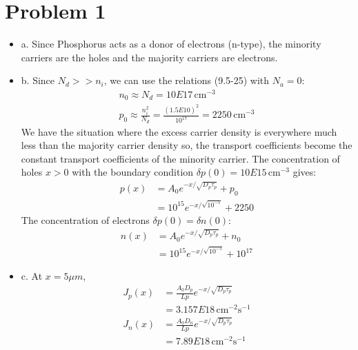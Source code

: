 \documentclass{article}
\newcommand{\unit}[1]{\ensuremath{\, \mathrm{#1}}}
\numberwithin{equation}{section}
\begin{document}
\section*{Problem 1}
\begin{itemize}
\item a. Since Phosphorus acts as a donor of electrons (n-type), the minority carriers are the holes and the majority carriers are electrons.
\item b. Since $N_d>>n_i$, we can use the relations (9.5-25) with $N_a=0$:
\begin{align*}
n_0\approx N_d=10E17 \unit{cm^{-3}}\\
p_0\approx \frac{n_i^2}{N_d}=\frac{(1.5E10)^2}{10^{17}}=2250 \unit{cm^{-3}}
\end{align*}
We have the situation where the excess carrier density is everywhere much less than the majority carrier density so, the transport coefficients become the constant transport coefficients of the minority carrier. The concentration of holes $x>0$ with the boundary condition $\delta p(0)=10E15 \unit{cm^{-3}}$ gives:
\begin{align*}
p(x)&=A_0e^{-x/\sqrt{D_p\tau_p}}+p_0\\
    &=10^{15}e^{-x/\sqrt{10^{-5}}}+2250	
\end{align*}
The concentration of electrons $\delta p(0)=\delta n(0)$:
\begin{align*}
n(x)&=A_0e^{-x/\sqrt{D_p\tau_p}}+n_0\\
    &=10^{15}e^{-x/\sqrt{10^{-5}}}+10^{17}
\end{align*}
\item c. At $x=5 \mu m$, 
\begin{align*}
J_p(x)&=\frac{A_0D_p}{Lp}e^{-x/\sqrt{D_p\tau_p}}\\
    &=3.157E18 \unit{cm^{-2}s^{-1}}\\
J_n(x)&=\frac{A_0D_n}{Lp}e^{-x/\sqrt{D_p\tau_p}}\\
    &=7.89E18 \unit{cm^{-2}s^{-1}}
\end{align*}
\end{itemize}
\end{document}
